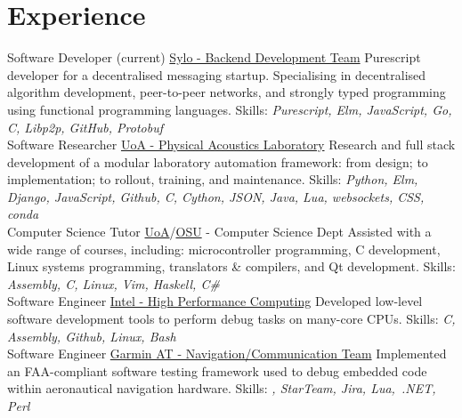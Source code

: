 \documentclass[a4paper]{twentysecondcv}
\begin{document}
\makeprofile{}

\section{Experience}
\begin{twenty}
           {}
           {Software Developer (current)}
           {\href{https://sylo.io/}{Sylo - Backend Development Team}}
           {}
           {Purescript developer for a decentralised messaging startup. Specialising
           in decentralised algorithm development, peer-to-peer networks, and
           strongly typed programming using functional programming languages.
           Skills: \emph{Purescript, Elm, JavaScript, Go, C, Libp2p, GitHub,
           Protobuf}} \\

           {}
           {Software Researcher}
           {\href{https://pal.auckland.ac.nz/}{UoA - Physical Acoustics Laboratory}}
           {}
           {Research and full stack development of a modular laboratory automation
           framework: from design; to implementation; to rollout, training, and
           maintenance.
           Skills: \emph{Python, Elm, Django, JavaScript, Github, C, Cython, JSON,
           Java, Lua, websockets, CSS, conda}} \\

           {}
           {Computer Science Tutor}
           {\href{http://www.auckland.ac.nz/}{UoA}/\href{http://www.oregonstate.edu/}{OSU} - Computer Science Dept}
           {}
           {Assisted with a wide range of courses, including: microcontroller
           programming, C development, Linux systems programming, translators
           \& compilers, and Qt development.
           Skills: \emph{Assembly, C, Linux, Vim, Haskell, C\#}} \\

           {}
           {Software Engineer}
           {\href{https://www.intel.com}{Intel - High Performance Computing}}
           {}
           {Developed low-level software development tools to perform debug
           tasks on many-core CPUs.
           Skills: \emph{C, Assembly, Github, Linux, Bash}} \\

           {}
           {Software Engineer}
           {\href{http://www.garmin.com}{Garmin AT - Navigation/Communication Team}}
           {}
           {Implemented an FAA-compliant software testing framework used to
           debug embedded code within aeronautical navigation hardware.
           Skills: \emph{\CC, StarTeam, Jira, Lua,~.NET, Perl}} \\


\end{twenty}
\end{document}
